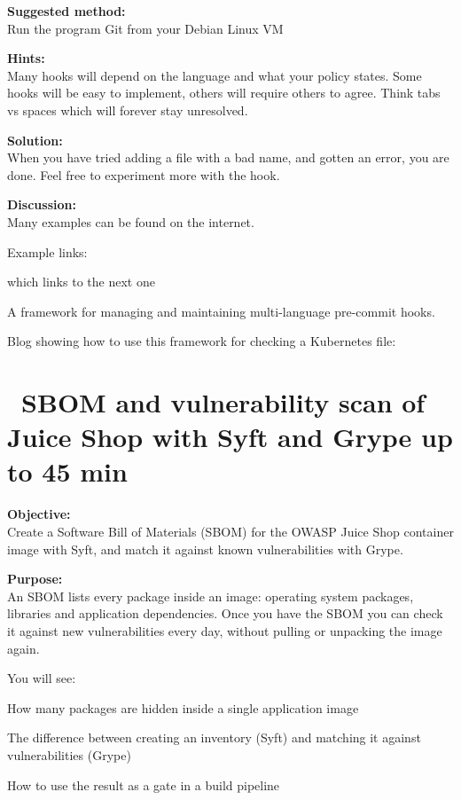 \documentclass[a4paper,11pt,notitlepage]{report}
\begin{document}
{\bf Suggested method:}\\
Run the program Git from your Debian Linux VM


{\bf Hints:}\\
Many hooks will depend on the language and what your policy states. Some hooks will be easy to implement, others will require others to agree. Think tabs vs spaces which will forever stay unresolved.

{\bf Solution:}\\
When you have tried adding a file with a bad name, and gotten an error, you are done. Feel free to experiment more with the hook.

{\bf Discussion:}\\
Many examples can be found on the internet.

Example links:
\begin{list2}
\item {} which links to the next one
\item A framework for managing and maintaining multi-language pre-commit hooks.\\
\item Blog showing how to use this framework for checking a Kubernetes file:\\
\end{list2}



\chapter{\faExclamationTriangle\ SBOM and vulnerability scan of Juice Shop with Syft and Grype up to 45 min}
\label{ex:syft-grype-juiceshop}

{\bf Objective:}\\
Create a Software Bill of Materials (SBOM) for the OWASP Juice Shop container image with Syft, and match it against known vulnerabilities with Grype.

{\bf Purpose:}\\
An SBOM lists every package inside an image: operating system packages, libraries and application dependencies. Once you have the SBOM you can check it against new vulnerabilities every day, without pulling or unpacking the image again.

You will see:
\begin{list2}
  \item How many packages are hidden inside a single application image
  \item The difference between creating an inventory (Syft) and matching it against vulnerabilities (Grype)
  \item How to use the result as a gate in a build pipeline
\end{list2}
\end{document}
